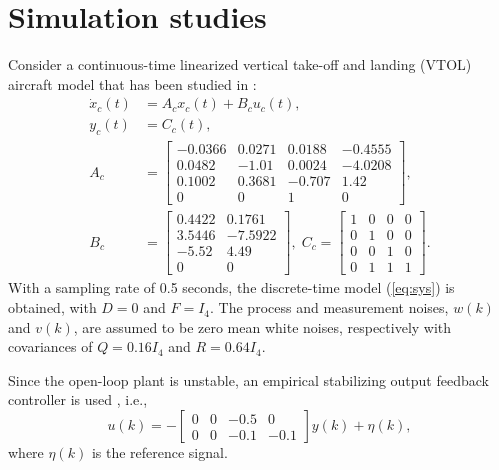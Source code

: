 \documentclass[twocolumn]{autart}
\begin{document}
\section{Simulation studies}\label{sect:sim}
Consider a continuous-time linearized vertical take-off and landing (VTOL) aircraft model that has been studied in \cite{Dong2012a, Dong2012b, Dong2012c, Gust2001}:
\begin{align*}
{\dot x}_c (t) &= A_c x_c(t) + B_c u_c(t), \\
y_c(t) &= C_c (t), \\
A_c &= \left[ \begin{smallmatrix}
                -0.0366 & 0.0271 & 0.0188 & -0.4555 \\
                0.0482 & -1.01 & 0.0024 & -4.0208 \\
                0.1002 & 0.3681 & -0.707 & 1.42 \\
                0 & 0 & 1 & 0
              \end{smallmatrix}
 \right], \\
B_c &= \left[ \begin{smallmatrix}
                0.4422 & 0.1761 \\
                3.5446 & -7.5922 \\
                -5.52 & 4.49 \\
                0 & 0
              \end{smallmatrix}
 \right],\;
C_c = \left[ \begin{smallmatrix}
               1 & 0 & 0 & 0 \\
               0 & 1 & 0 & 0 \\
               0 & 0 & 1 & 0 \\
               0 & 1 & 1 & 1
             \end{smallmatrix}
 \right].
\end{align*}
With a sampling rate of 0.5 seconds, the discrete-time model (\ref{eq:sys}) is obtained, with $D=0$ and $F=I_4$. The process and measurement noises, $w(k)$ and $v(k)$, are assumed to be zero mean white noises, respectively with covariances of $Q = 0.16 I_4$ and $R = 0.64 I_4$.

Since the open-loop plant is unstable, an empirical stabilizing output feedback controller is used \cite{Dong2012c}, i.e.,
\begin{equation}\label{eq:controller}
u(k) = - \left[ \begin{smallmatrix}
                  0 & 0 & -0.5 & 0 \\
                  0 & 0 & -0.1 & -0.1
                \end{smallmatrix}
 \right] y(k) + \eta(k),
\end{equation}
where $\eta(k)$ is the reference signal.
\end{document}
